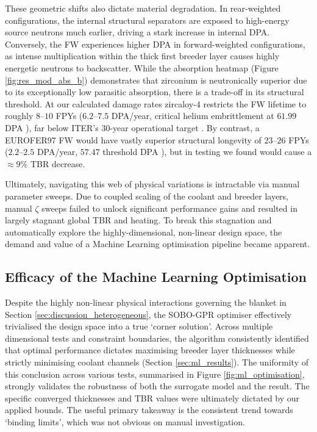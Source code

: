 \documentclass[11pt]{article}
\begin{document}
These geometric shifts also dictate material degradation. In rear-weighted configurations, the
internal structural separators are exposed to high-energy source neutrons much earlier, driving a
stark increase in internal DPA. Conversely, the FW experiences higher DPA in forward-weighted
configurations, as intense multiplication within the thick first breeder layer causes highly
energetic neutrons to backscatter. While the absorption heatmap (Figure \ref{fig:res_mod_abs_b})
demonstrates that zirconium is neutronically superior due to its exceptionally low parasitic
absorption, there is a trade-off in its structural threshold. At our calculated damage rates
zircaloy-4 restricts the FW lifetime to roughly $8$--$10$ FPYs ($6.2$--$7.5$ DPA/year, critical
helium embrittlement at $61.99$ DPA \citep{gilbert_integrated_2012}), far below ITER's 30-year
operational target \citep{aymar_iter_2002}. By contrast, a EUROFER97 FW  would have vastly superior
structural longevity of $23$--$26$ FPYs ($2.2$--$2.5$ DPA/year, $57.47$ threshold DPA
\citep{woods_properties_1966}), but in testing we found would cause a $\approx9\%$ TBR decrease.

Ultimately, navigating this web of physical variations is intractable via manual parameter sweeps.
Due to coupled scaling of the coolant and breeder layers, manual $\zeta$ sweeps failed to unlock
significant performance gains and resulted in largely stagnant global TBR and heating. To break this
stagnation and automatically explore the highly-dimensional, non-linear design space, the demand and
value of a Machine Learning optimisation pipeline became apparent.

\subsection{Efficacy of the Machine Learning Optimisation}
\label{sec:discussion_ml}

Despite the highly non-linear physical interactions governing the blanket in Section
\ref{sec:discussion_heterogeneous}, the SOBO-GPR optimiser effectively trivialised the design space
into a true `corner solution'. Across multiple dimensional tests and constraint boundaries, the
algorithm consistently identified that optimal performance dictates maximising breeder layer
thicknesses while strictly minimising coolant channels (Section \ref{sec:ml_results}). The
uniformity of this conclusion across various tests, summarised in Figure \ref{fig:ml_optimisation},
strongly validates the robustness of both the surrogate model and the result. The specific converged
thicknesses and TBR values were ultimately dictated by our applied bounds. The useful primary
takeaway is the consistent trend towards `binding limits', which was not obvious on manual
investigation.
\end{document}
